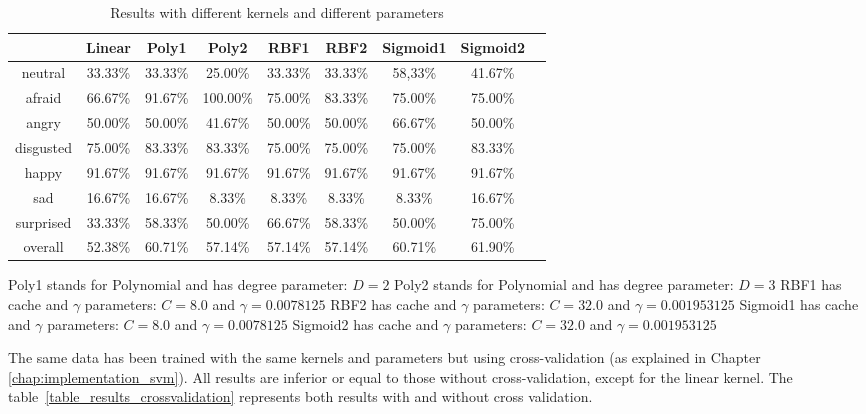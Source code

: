 \begin{table}[h]
   \caption{\label{table_results_kernels} Results with different kernels and different parameters}
   \begin {center}
\begin{tabular}{|c|c|c|c|c|c|c|c|c|}
  \hline
    & Linear & Poly1 & Poly2 & RBF1 & RBF2 & Sigmoid1 & Sigmoid2 \\
  \hline
  neutral & 33.33\% & 33.33\% & 25.00\% & 33.33\% & 33.33\% & 58,33\% & 41.67\% \\
  afraid & 66.67\% & 91.67\% & 100.00\% & 75.00\% & 83.33\% & 75.00\% & 75.00\% \\
  angry & 50.00\% & 50.00\% & 41.67\% & 50.00\% & 50.00\% & 66.67\% & 50.00\% \\
  disgusted & 75.00\% & 83.33\% & 83.33\% & 75.00\% & 75.00\% & 75.00\% & 83.33\% \\
  happy & 91.67\% & 91.67\% & 91.67\% & 91.67\% & 91.67\% & 91.67\% & 91.67\% \\
  sad & 16.67\% & 16.67\% & 8.33\% & 8.33\% & 8.33\% & 8.33\% & 16.67\% \\
  surprised & 33.33\% & 58.33\% & 50.00\% & 66.67\% & 58.33\% & 50.00\% & 75.00\% \\
  overall & 52.38\% & 60.71\% & 57.14\% & 57.14\% & 57.14\% & 60.71\% & 61.90\% \\
  \hline
\end{tabular}
\end {center}
\end{table}

\noindent Poly1 stands for Polynomial and has degree parameter: $ D = 2 $
\newline
\noindent Poly2 stands for Polynomial and has degree parameter: $ D = 3 $
\newline
\noindent RBF1 has cache and $\gamma$ parameters: $ C = 8.0 $ and $ \gamma = 0.0078125 $
\newline
\noindent RBF2 has cache and $\gamma$ parameters: $ C = 32.0 $ and $ \gamma = 0.001953125 $ 
\newline
\noindent Sigmoid1 has cache and $\gamma$ parameters: $ C = 8.0 $ and $ \gamma = 0.0078125 $
\newline
\noindent Sigmoid2 has cache and $\gamma$ parameters: $ C = 32.0 $ and $ \gamma = 0.001953125 $
\newline

\noindent The same data has been trained with the same kernels and parameters but using cross-validation (as explained in Chapter \ref{chap:implementation_svm}). All results are inferior or equal to those without cross-validation, except for the linear kernel. The table~\ref{table_results_crossvalidation} represents both results with and without cross validation.
\newline

